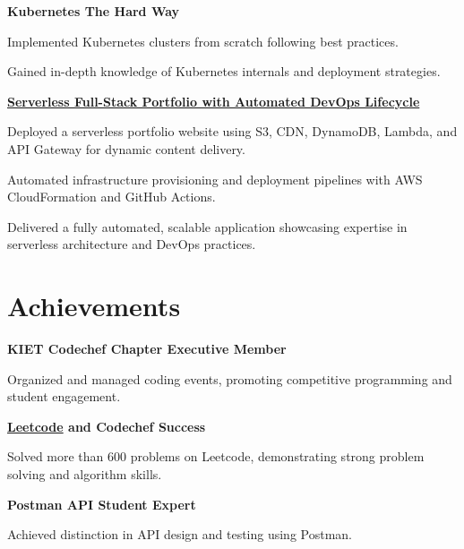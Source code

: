 \documentclass[letterpaper,10pt]{article}
\newcommand{\heading}[2]{
  \hspace{10pt}#1\hfill#2\\
}
\newcommand{\headingBf}[2]{
  \heading{\textbf{#1}}{\textbf{#2}}
}
\newenvironment{resume_list}{
  \vspace{-7pt}
  \begin{itemize}[itemsep=-2px, parsep=1pt, leftmargin=30pt]
}{
  \end{itemize}
}
\begin{document}
\headingBf{Kubernetes The Hard Way}{}
\begin{resume_list}
  \item Implemented Kubernetes clusters from scratch following best practices.
  \item Gained in-depth knowledge of Kubernetes internals and deployment strategies.
\end{resume_list}

\headingBf{\href {https://github.com/1md3nd/portfolio}{Serverless Full-Stack Portfolio with Automated DevOps Lifecycle}}{}
\begin{resume_list}
  \item Deployed a serverless portfolio website using S3, CDN, DynamoDB, Lambda, and API Gateway for dynamic content delivery.
  \item Automated infrastructure provisioning and deployment pipelines with AWS CloudFormation and GitHub Actions.
  \item Delivered a fully automated, scalable application showcasing expertise in serverless architecture and DevOps practices.

\end{resume_list}

\section{Achievements}
\headingBf{KIET Codechef Chapter Executive Member}{}
\begin{resume_list}
\item Organized and managed coding events, promoting competitive programming and student engagement.
\end{resume_list}

\headingBf{\href {https://www.leetcode.com/1md3nd}{Leetcode} and Codechef Success}{}
\begin{resume_list}
\item Solved more than 600 problems on Leetcode, demonstrating strong problem solving and algorithm skills.
\end{resume_list}

\headingBf{Postman API Student Expert}{}
\begin{resume_list}
\item Achieved distinction in API design and testing using Postman.
\end{resume_list}
\end{document}
